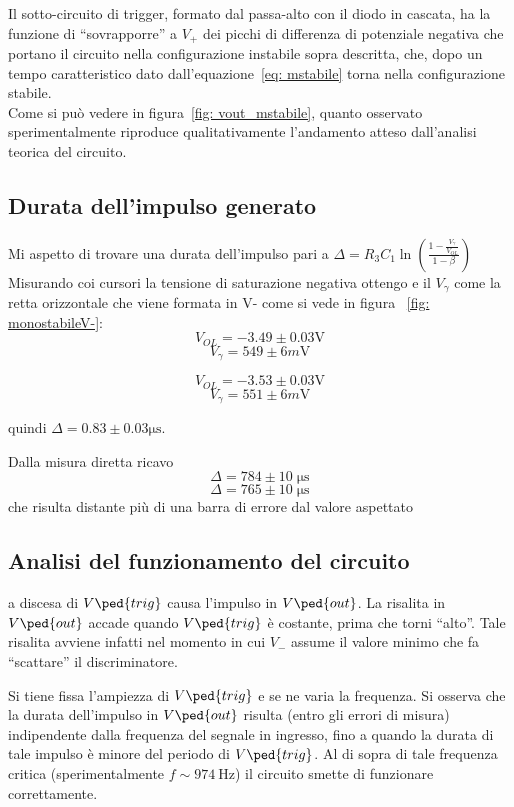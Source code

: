 \documentclass[10pt, a4paper, italian]{article}
\begin{document}
Il sotto-circuito di trigger, formato dal passa-alto con il diodo in cascata, ha la funzione di ``sovrapporre'' a $ V_{+} $ dei picchi di differenza di potenziale negativa che portano il circuito nella configurazione instabile sopra descritta, che, dopo un tempo caratteristico dato dall'equazione~\eqref{eq: mstabile} torna nella configurazione stabile. \\

Come si può vedere in figura~\ref{fig: vout_mstabile}, quanto osservato 
sperimentalmente riproduce qualitativamente l'andamento atteso dall'analisi
teorica del circuito.

\subsection{Durata dell'impulso generato}
Mi aspetto di trovare una durata dell'impulso pari a $\Delta= R_3 C_1 \ln(\frac{1 - \frac{V_\gamma}{V_{OL}}}{1 - \beta})$
Misurando coi cursori la tensione di saturazione negativa ottengo e il $V_\gamma$ come la retta orizzontale che viene formata in V- come si vede in figura ~\ref{fig: monostabileV-}:
\[
V_{OL}= -3.49 \pm 0.03 \si{\V}
\]
\[
V_{\gamma}= 549 \pm 6 \si{m\V}
\]


\[
V_{OL}= -3.53 \pm 0.03 \si{\V}
\]
\[
V_{\gamma}= 551 \pm 6 \si{m\V}
\]

quindi $\Delta= 0.83 \pm 0.03 \si{\micro\s}$.

Dalla misura diretta ricavo
\[
\Delta= 784 \pm 10 \;\si{\micro\s}
\]
\[
\Delta= 765 \pm 10 \;\si{\micro\s}
\]
che risulta distante più di una barra di errore dal valore aspettato
\subsection{Analisi del funzionamento del circuito}
a discesa di $ V\ped{trig} $ causa l'impulso in $ V\ped{out} $. La risalita in $ V\ped{out} $ accade quando $ V\ped{trig} $ è costante, prima che torni ``alto''. Tale risalita avviene infatti nel momento in cui $ V_{-} $ assume il valore minimo che fa ``scattare'' il discriminatore.

Si tiene fissa l'ampiezza di $ V\ped{trig} $ e se ne varia la frequenza. Si osserva che la durata dell'impulso in $ V \ped{out} $ risulta (entro gli errori di misura) indipendente dalla frequenza del segnale in ingresso, fino a quando la durata di tale impulso è minore del periodo di $ V\ped{trig} $. Al di sopra di tale frequenza critica (sperimentalmente $ f \sim \SI{974}{\hertz} $) il circuito smette di funzionare correttamente.
\end{document}
